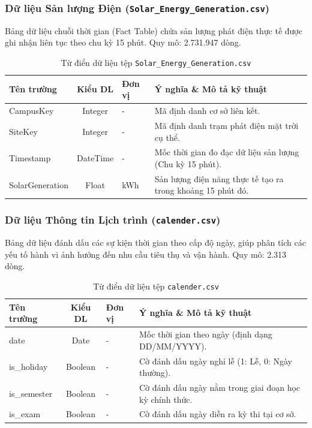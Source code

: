 \documentclass[12pt,a4paper]{article}
\begin{document}
\subsubsection{Dữ liệu Sản lượng Điện (\texttt{Solar\_Energy\_Generation.csv})}
Bảng dữ liệu chuỗi thời gian (Fact Table) chứa sản lượng phát điện thực tế được ghi nhận liên tục theo chu kỳ 15 phút. Quy mô: 2.731.947 dòng.
\begin{table}[H]
\centering
\caption{Từ điển dữ liệu tệp \texttt{Solar\_Energy\_Generation.csv}}
\renewcommand{\arraystretch}{1.4}
\begin{tabularx}{\textwidth}{p{3.5cm} c p{2cm} X}
\toprule
\textbf{Tên trường} & \textbf{Kiểu DL} & \textbf{Đơn vị} & \textbf{Ý nghĩa \& Mô tả kỹ thuật} \\
\midrule
CampusKey       & Integer  & -   & Mã định danh cơ sở liên kết. \\
SiteKey         & Integer  & -   & Mã định danh trạm phát điện mặt trời cụ thể. \\
Timestamp       & DateTime & -   & Mốc thời gian đo đạc dữ liệu sản lượng (Chu kỳ 15 phút). \\
Solar\allowbreak Generation & Float    & kWh & Sản lượng điện năng thực tế tạo ra trong khoảng 15 phút đó. \\
\bottomrule
\end{tabularx}
\end{table}

\subsubsection{Dữ liệu Thông tin Lịch trình (\texttt{calender.csv})}
Bảng dữ liệu đánh dấu các sự kiện thời gian theo cấp độ ngày, giúp phân tích các yếu tố hành vi ảnh hưởng đến nhu cầu tiêu thụ và vận hành. Quy mô: 2.313 dòng.
\begin{table}[H]
\centering
\caption{Từ điển dữ liệu tệp \texttt{calender.csv}}
\renewcommand{\arraystretch}{1.4}
\begin{tabularx}{\textwidth}{p{3.5cm} c p{2cm} X}
\toprule
\textbf{Tên trường} & \textbf{Kiểu DL} & \textbf{Đơn vị} & \textbf{Ý nghĩa \& Mô tả kỹ thuật} \\
\midrule
date         & Date    & - & Mốc thời gian theo ngày (định dạng DD/MM/YYYY). \\
is\_holiday  & Boolean & - & Cờ đánh dấu ngày nghỉ lễ (1: Lễ, 0: Ngày thường). \\
is\_semester & Boolean & - & Cờ đánh dấu ngày nằm trong giai đoạn học kỳ chính thức. \\
is\_exam     & Boolean & - & Cờ đánh dấu ngày diễn ra kỳ thi tại cơ sở. \\
\bottomrule
\end{tabularx}
\end{table}
\end{document}

